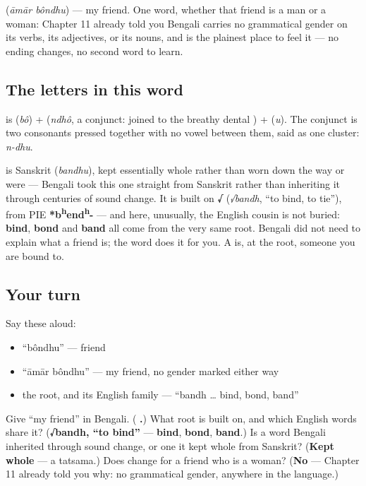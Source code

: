 \textbf{ } (\emph{āmār bôndhu}) — my friend. One word, whether that friend is a man or a woman: Chapter 11 already told you Bengali carries no grammatical gender on its verbs, its adjectives, or its nouns, and  is the plainest place to feel it — no ending changes, no second word to learn.

\subsection*{The letters in this word}
\textbf{} is \textbf{} (\emph{bô}) + \textbf{} (\emph{ndhô}, a conjunct:  joined to the breathy dental ) + \textbf{} (\emph{u}). The conjunct is two consonants pressed together with no vowel between them, said as one cluster: \emph{n-dhu}.

\begin{cousinweb}
\textbf{} is Sanskrit \textbf{} (\emph{bandhu}), kept essentially whole rather than worn down the way  or  were — Bengali took this one straight from Sanskrit rather than inheriting it through centuries of sound change. It is built on \textbf{√} (\emph{√bandh}, \textquotedblleft{}to bind, to tie\textquotedblright{}), from PIE \textbf{*b\textsuperscript{h}end\textsuperscript{h}-} — and here, unusually, the English cousin is not buried: \textbf{bind}, \textbf{bond} and \textbf{band} all come from the very same root. Bengali did not need to explain what a friend is; the word does it for you. A  is, at the root, someone you are bound to.
\end{cousinweb}

\subsection*{Your turn}
Say these aloud:

\begin{itemize}
\raggedright
  \item \textquotedblleft{}bôndhu\textquotedblright{} — friend
  \item \textquotedblleft{}āmār bôndhu\textquotedblright{} — my friend, no gender marked either way
  \item the root, and its English family — \textquotedblleft{}bandh … bind, bond, band\textquotedblright{}
\end{itemize}

\begin{tcolorbox}[breakable,colback=teal!4,colframe=teal!35!black,title={Before you move on}]
Give \textquotedblleft{}my friend\textquotedblright{} in Bengali. (\textbf{ .}) What root is  built on, and which English words share it? (\textbf{√bandh, \textquotedblleft{}to bind\textquotedblright{}} — \textbf{bind}, \textbf{bond}, \textbf{band}.) Is  a word Bengali inherited through sound change, or one it kept whole from Sanskrit? (\textbf{Kept whole} — a tatsama.) Does  change for a friend who is a woman? (\textbf{No} — Chapter 11 already told you why: no grammatical gender, anywhere in the language.)
\end{tcolorbox}
